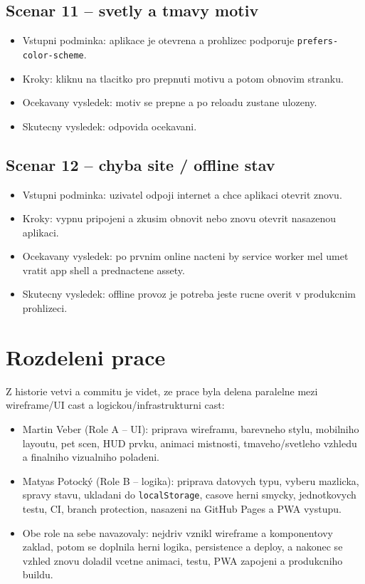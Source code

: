 \documentclass[12pt,a4paper]{article}
\begin{document}
\subsection*{Scenar 11 -- svetly a tmavy motiv}
\begin{itemize}[leftmargin=2em]
  \item Vstupni podminka: aplikace je otevrena a prohlizec podporuje \texttt{prefers-color-scheme}.
  \item Kroky: kliknu na tlacitko pro prepnuti motivu a potom obnovim stranku.
  \item Ocekavany vysledek: motiv se prepne a po reloadu zustane ulozeny.
  \item Skutecny vysledek: odpovida ocekavani.
\end{itemize}

\subsection*{Scenar 12 -- chyba site / offline stav}
\begin{itemize}[leftmargin=2em]
  \item Vstupni podminka: uzivatel odpoji internet a chce aplikaci otevrit znovu.
  \item Kroky: vypnu pripojeni a zkusim obnovit nebo znovu otevrit nasazenou aplikaci.
  \item Ocekavany vysledek: po prvnim online nacteni by service worker mel umet vratit app shell a prednactene assety.
  \item Skutecny vysledek: offline provoz je potreba jeste rucne overit v produkcnim prohlizeci.
\end{itemize}

\section{Rozdeleni prace}

Z historie vetvi a commitu je videt, ze prace byla delena paralelne mezi wireframe/UI cast a logickou/infrastrukturni cast:

\begin{itemize}[leftmargin=2em]
  \item Martin Veber (Role A -- UI): priprava wireframu, barevneho stylu, mobilniho layoutu, pet scen, HUD prvku, animaci mistnosti, tmaveho/svetleho vzhledu a finalniho vizualniho poladeni.
  \item Matyas Potock\'y (Role B -- logika): priprava datovych typu, vyberu mazlicka, spravy stavu, ukladani do \texttt{localStorage}, casove herni smycky, jednotkovych testu, CI, branch protection, nasazeni na GitHub Pages a PWA vystupu.
  \item Obe role na sebe navazovaly: nejdriv vznikl wireframe a komponentovy zaklad, potom se doplnila herni logika, persistence a deploy, a nakonec se vzhled znovu doladil vcetne animaci, testu, PWA zapojeni a produkcniho buildu.
\end{itemize}
\end{document}
